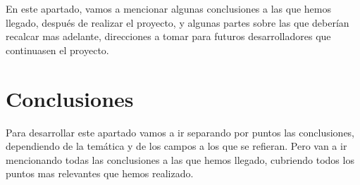 

En este apartado, vamos a mencionar algunas conclusiones a las que hemos llegado, después de realizar el proyecto, y algunas partes sobre las que deberían recalcar mas adelante, direcciones a tomar para futuros desarrolladores que continuasen el proyecto.



\section{Conclusiones}
Para desarrollar este apartado vamos a ir separando por puntos las conclusiones, dependiendo de la temática y de los campos a los que se refieran.
Pero van a ir mencionando todas las conclusiones a las que hemos llegado, cubriendo todos los puntos mas relevantes que hemos realizado.

